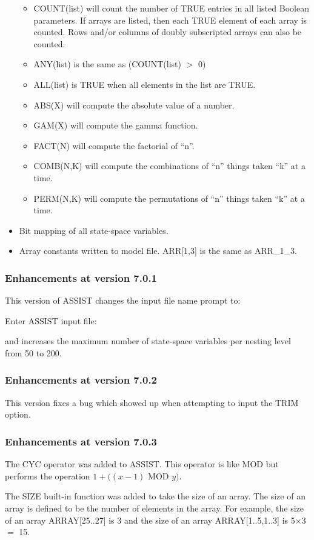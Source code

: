 \begin{itemize}
\begin{itemize}
      \item COUNT(list) will count the number of TRUE entries in all listed
                        Boolean parameters.   If arrays are listed, then
                        each TRUE element of each array is counted.
                      Rows and/or columns of doubly subscripted arrays can also
                      be counted.
      \item ANY(list) is the same as (COUNT(list) $>$ 0)
      \item ALL(list) is TRUE when all elements in the list are TRUE.
      \item ABS(X) will compute the absolute value of a number.
      \item GAM(X) will compute the gamma function.
      \item FACT(N) will compute the factorial of ``n''.
      \item COMB(N,K) will compute the combinations of ``n'' things taken ``k'' at a time.
      \item PERM(N,K) will compute the permutations of ``n'' things taken ``k'' at a time.
      \end{itemize}
\item Bit mapping of all state-space variables.
\item Array constants written to model file.   ARR[1,3] is the same as ARR\_1\_3.
\end{itemize}

\subsubsection{Enhancements at version 7.0.1}

This version of ASSIST changes the input file name prompt to:
\begin{codeexample}
Enter ASSIST input file:
\end{codeexample}
and increases the maximum number of state-space variables per nesting level
from 50 to 200.
\subsubsection{Enhancements at version 7.0.2}
This version fixes a bug which showed up when attempting to input the
TRIM option.
\subsubsection{Enhancements at version 7.0.3}
\begin{indenteditems}
\item The CYC operator was added to ASSIST.
This operator is like MOD but performs
the operation $1 + ((x-1)$ MOD $y)$.
\item The SIZE built-in function was added to take the size of an array.
The size of an array is defined to be the number of elements in the array.
For example, the size of an array ARRAY[25..27] is 3 and the size of an
array ARRAY[1..5,1..3] is 5$\times$3 $=$ 15.
\end{indenteditems}


